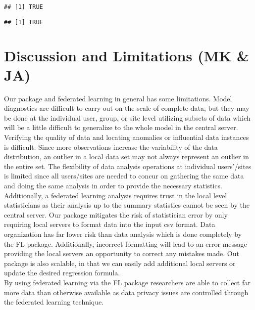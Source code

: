 \documentclass[
]{article}
\newenvironment{Shaded}{\begin{snugshade}}{\end{snugshade}}
\newcommand{\FunctionTok}[1]{\textcolor[rgb]{0.00,0.00,0.00}{#1}}
\newcommand{\NormalTok}[1]{#1}
\newcommand{\SpecialCharTok}[1]{\textcolor[rgb]{0.00,0.00,0.00}{#1}}
\newcommand{\StringTok}[1]{\textcolor[rgb]{0.31,0.60,0.02}{#1}}
\begin{document}
\begin{verbatim}
## [1] TRUE
\end{verbatim}

\begin{Shaded}
\end{Shaded}

\begin{verbatim}
## [1] TRUE
\end{verbatim}

\hypertarget{discussion-and-limitations-mk-ja}{%
\section{Discussion and Limitations (MK \&
JA)}\label{discussion-and-limitations-mk-ja}}

Our package and federated learning in general has some limitations.
Model diagnostics are difficult to carry out on the scale of complete
data, but they may be done at the individual user, group, or site level
utilizing subsets of data which will be a little difficult to generalize
to the whole model in the central server. Verifying the quality of data
and locating anomalies or influential data instances is difficult. Since
more observations increase the variability of the data distribution, an
outlier in a local data set may not always represent an outlier in the
entire set. The flexibility of data analysis operations at individual
users'/sites is limited since all users/sites are needed to concur on
gathering the same data and doing the same analysis in order to provide
the necessary statistics. Additionally, a federated learning analysis
requires trust in the local level statisticians as their analysis up to
the summary statistics cannot be seen by the central server. Our package
mitigates the risk of statistician error by only requiring local servers
to format data into the input csv format. Data organization has far
lower risk than data analysis which is done completely by the FL
package. Additionally, incorrect formatting will lead to an error
message providing the local servers an opportunity to correct any
mistakes made. Out package is also scalable, in that we can easily add
additional local servers or update the desired regression formula.\\
By using federated learning via the FL package researchers are able to
collect far more data than otherwise available as data privacy issues
are controlled through the federated learning technique.
\end{document}
